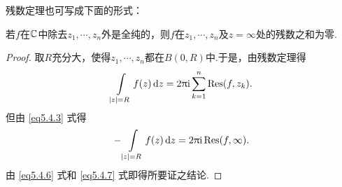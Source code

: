 残数定理也可写成下面的形式：
\begin{theorem}\label{thm5.4.12}
  若$f$在$\mathbb C$中除去$z_1,\cdots,z_n$外是全纯的，则$f$在$z_1,\cdots,z_n$及$z=\infty$处的残数之和为零.
\end{theorem}
\begin{proof}
  取$R$充分大，使得$z_1,\cdots,z_n$都在$B(0,R)$中.于是，由残数定理得
  \begin{equation}\label{eq5.4.6}
    \int\limits_{|z|=R}f(z)\mathop{}\!\mathrm dz=2\uppi\mathrm i\sum_{k=1}^n\operatorname*{Res}(f,z_k).
  \end{equation}
  但由 \eqref{eq5.4.3} 式得
  \begin{equation}\label{eq5.4.7}
    -\int\limits_{|z|=R}f(z)\mathop{}\!\mathrm dz=2\uppi\mathrm i\operatorname*{Res}(f,\infty).
  \end{equation}
  由 \eqref{eq5.4.6} 式和 \eqref{eq5.4.7} 式即得所要证之结论.
\end{proof}

